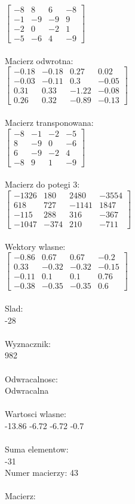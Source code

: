 \documentclass[a4paper,12pt]{article}
\begin{document}
$\begin{bmatrix} -8&8&6&-8\\-1&-9&-9&9\\-2&0&-2&1\\-5&-6&4&-9 \end{bmatrix}$
\\
\\
Macierz odwrotna:\\

$\begin{bmatrix} -0.18&-0.18&0.27&0.02\\-0.03&-0.11&0.3&-0.05\\0.31&0.33&-1.22&-0.08\\0.26&0.32&-0.89&-0.13 \end{bmatrix}$
\\
\\
Macierz transponowana:\\

$\begin{bmatrix} -8&-1&-2&-5\\8&-9&0&-6\\6&-9&-2&4\\-8&9&1&-9 \end{bmatrix}$
\\
\\
Macierz do potegi 3:\\

$\begin{bmatrix} -1326&180&2480&-3554\\618&727&-1141&1847\\-115&288&316&-367\\-1047&-374&210&-711 \end{bmatrix}$
\\
\\
Wektory wlasne:\\

$\begin{bmatrix} -0.86&0.67&0.67&-0.2\\0.33&-0.32&-0.32&-0.15\\-0.11&0.1&0.1&0.76\\-0.38&-0.35&-0.35&0.6 \end{bmatrix}$
\\
\\
Slad:\\
-28
\\
\\
Wyznacznik:\\
982
\\
\\
Odwracalnosc:\\
Odwracalna
\\
\\
Wartosci wlasne:\\
-13.86 -6.72 -6.72 -0.7
\\
\\
Suma elementow:\\
-31
\\
\newpage
Numer macierzy:
43
\\
\\
Macierz:\\
\end{document}
